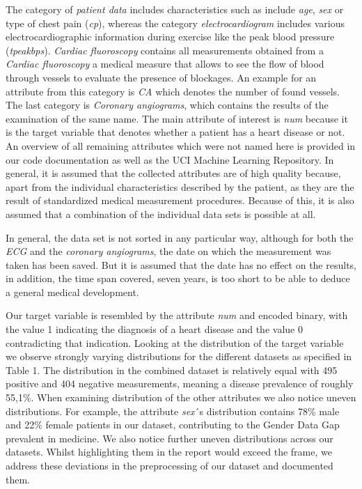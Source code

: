 The category of \textit{patient data} includes characteristics such as include \textit{age}, \textit{sex} or type of chest pain (\textit{cp}), whereas the category \textit{electrocardiogram} includes various electrocardiographic information during exercise like the peak blood pressure (\textit{tpeakbps}). \textit{Cardiac fluoroscopy} contains all measurements obtained from a \textit{Cardiac fluoroscopy} a medical measure that allows to see the flow of blood through vessels to evaluate the presence of blockages. An example for an attribute from this category is \textit{CA} which denotes the number of found vessels. The last category is \textit{Coronary angiograms}, which contains the results of the examination of the same name. The main attribute of interest is \textit{num} because it is the target variable that denotes whether a patient has a heart disease or not. An overview of all remaining attributes which were not named here is provided in our code documentation as well as the UCI Machine Learning Repository\citep{janosi1988}. In general, it is assumed that the collected attributes are of high quality because, apart from the individual characteristics described by the patient, as they are the result of standardized medical measurement procedures. Because of this, it is also assumed that a combination of the individual data sets is possible at all.   

In general, the data set is not sorted in any particular way, although for both the \textit{ECG} and the \textit{coronary angiograms}, the date on which the measurement was taken has been saved. 
But it is assumed that the date has no effect on the results, in addition, the time span covered, seven years, is too short to be able to deduce a general medical development. 








Our target variable is resembled by the attribute \textit{num} and encoded binary, with the value 1 indicating the diagnosis of a heart disease and the value 0 contradicting that indication. Looking at the distribution of the target variable we observe strongly varying distributions for the different datasets as specified in Table 1. The distribution in the combined dataset is relatively equal with 495 positive and 404 negative measurements, meaning a disease prevalence of roughly 55,1\%. When examining distribution of the other attributes we also notice uneven distributions. For example, the attribute \textit{sex}´s distribution contains 78\% male and 22\% female patients in our dataset, contributing to the Gender Data Gap prevalent in medicine. We also notice further uneven distributions across our datasets. Whilst highlighting them in the report would exceed the frame, we address these deviations in the preprocessing of our dataset and documented them.

